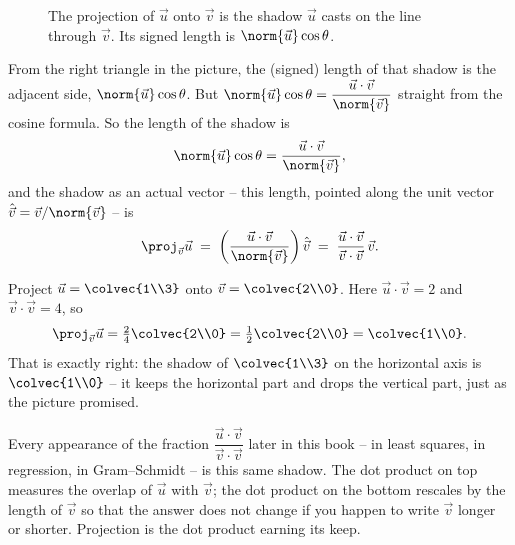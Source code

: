 \begin{figure}[H]
\centering
{}
\caption{The projection of $\vec u$ onto $\vec v$ is the shadow $\vec u$ casts on the
line through $\vec v$. Its signed length is $\norm{\vec u}\cos\theta$.}
\label{ch04:proj}
\end{figure}

From the right triangle in the picture, the (signed) length of that shadow is the
adjacent side, $\norm{\vec u}\cos\theta$. But
$\norm{\vec u}\cos\theta = \dfrac{\vec u\cdot\vec v}{\norm{\vec v}}$ straight from
the cosine formula. So the length of the shadow is
\[
  \norm{\vec u}\cos\theta = \frac{\vec u\cdot\vec v}{\norm{\vec v}},
\]
and the shadow as an actual vector -- this length, pointed along the unit vector
$\hat{\vec v} = \vec v/\norm{\vec v}$ -- is
\[
  \proj_{\vec v}\vec u
   \;=\; \left(\frac{\vec u\cdot\vec v}{\norm{\vec v}}\right)\hat{\vec v}
   \;=\; \frac{\vec u\cdot\vec v}{\vec v\cdot\vec v}\,\vec v.
\]

\begin{example}
Project $\vec u = \colvec{1\\3}$ onto $\vec v = \colvec{2\\0}$. Here
$\vec u\cdot\vec v = 2$ and $\vec v\cdot\vec v = 4$, so
\[
  \proj_{\vec v}\vec u = \tfrac24\colvec{2\\0} = \tfrac12\colvec{2\\0}
                       = \colvec{1\\0}.
\]
That is exactly right: the shadow of $\colvec{1\\3}$ on the horizontal axis is
$\colvec{1\\0}$ -- it keeps the horizontal part and drops the vertical part, just as
the picture promised.
\end{example}

\begin{intuitionbox}
Every appearance of the fraction $\dfrac{\vec u\cdot\vec v}{\vec v\cdot\vec v}$ later
in this book -- in least squares, in regression, in Gram--Schmidt -- is this same
shadow. The dot product on top measures the overlap of $\vec u$ with $\vec v$; the
dot product on the bottom rescales by the length of $\vec v$ so that the answer does
not change if you happen to write $\vec v$ longer or shorter. Projection is the dot
product earning its keep.
\end{intuitionbox}

